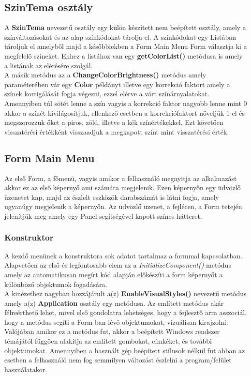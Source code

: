 \documentclass[tocnopagenum]{thesis-ekf}
\theoremstyle{definition}
\theoremstyle{remark}
\begin{document}
	\subsection{SzinTema osztály}
	A \textbf{SzinTema} nevezetű osztály egy külön készített nem beépített osztály, amely a színváltozásokat és az alap színkódokat tárolja el.
	A színkódokat egy Listában tároljuk el amelyből majd a későbbiekben a Form Main Menu Form választja ki a megfelelő színeket. Ehhez a listához van egy \textbf{getColorList()} metódusa is amely a listának az elérésére szolgál. 
	\\
	A másik metódus az a \textbf{ChangeColorBrightness()} metódus amely paraméterében vár egy \textbf{Color} példányt illetve egy korrekció faktort amely a színek korrigálását fogja végezni, ezzel elérve a várt színárnyalatokat. Amennyiben túl sötét lenne a szín vagyis a korrekció faktor nagyobb lenne mint 0 akkor a színét kivilágosítjuk, ellenkező esetben a korrekciófaktort növeljük 1-el és megszorozzuk őket a piros, zöld, illetve a kék színértékekkel. Ezt követően visszatérési értékként visszaadjuk a megkapott színt mint visszatérési érték. 
	\subsection*{Form Main Menu}
	\label{FormMainmenu}
	Az első Form, a főmenü, vagyis amikor a felhasználó megnyitja az alkalmazást akkor ez az első képernyő ami számára megjelenik. 
	Ezen képernyőn egy üdvözlő üzenetet kap, majd az észlelt eszközök darabszámát is látni fogja, amely ugyanúgy megjelenik a képernyőn.
	Az üdvözlő üzenet, a fejlécen, a Form tetején jelenítjük meg amely egy Panel segítségével kapott színes hátteret.
	\subsubsection{Konstruktor}
	A kezdő menünek a konstruktora sok adatot tartalmaz a formmal kapcsolatban. Alapvetően az első és legfontosabb elem az a \textit{InitializeComponent()} metódus amely az automatikusan megírt kód alapján előkészíti a form képernyőt a különböző objektumok fogadására.
	\\
	 A kinézethez nagyban hozzájárult a(z) \textbf{EnableVisualStyles()} nevezetű metódus amely a(z) \textbf{Application} osztály egy metódusa. Az említett metódus akár félreérthető lehet, mivel első gondolatra lehetséges, hogy a fejlesztő arra asszociál, hogy a metódus segíti a Form-ban lévő objektumokat, vizuálisan kirajzolni. Valójában amikor ez a metódus fut, akkor a beépített Windows rendszer témájától függően alakítja az említett gombokat, címkéket, és további objektumokat. Amennyiben a használt gép beépített stílusok nélkül fut abban az esetben a felhasználó nem fog semmilyen változást észlelni a program/felület használatakor.
\end{document}

